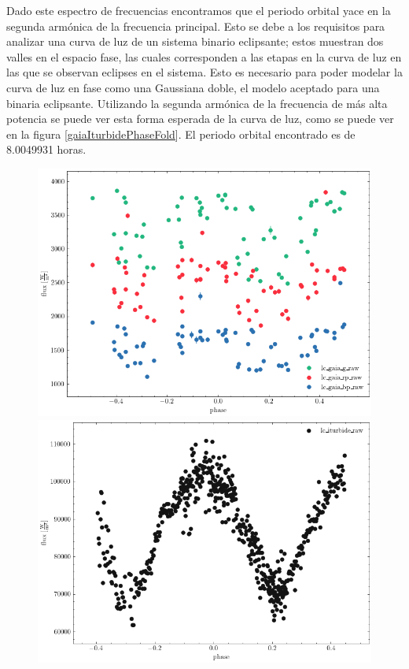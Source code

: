Dado este espectro de frecuencias encontramos que el periodo orbital yace en la
segunda armónica de la frecuencia principal. Esto se debe a los requisitos para
analizar una curva de luz de un sistema binario eclipsante; estos muestran dos
valles en el espacio fase, las cuales corresponden a las etapas en la curva de
luz en las que se observan eclipses en el sistema. Esto es necesario para poder
modelar la curva de luz en fase como una Gaussiana doble, el modelo aceptado
para una binaria eclipsante. %
Utilizando la segunda armónica de la frecuencia de más alta potencia se puede
ver esta forma esperada de la curva de luz, como se puede ver en la figura
\ref{gaiaIturbidePhaseFold}. El periodo orbital encontrado es de 8.0049931 horas.

\begin{figure}[!h]
	\centering
	\includegraphics[scale=0.72]{Metodologia/Secciones/AnalisisPeriodo/Figures/Gaia Phase-Folded.png}
	\includegraphics[scale=0.72]{Metodologia/Secciones/AnalisisPeriodo/Figures/Iturbide Phase-Folded.png}


\end{figure}
